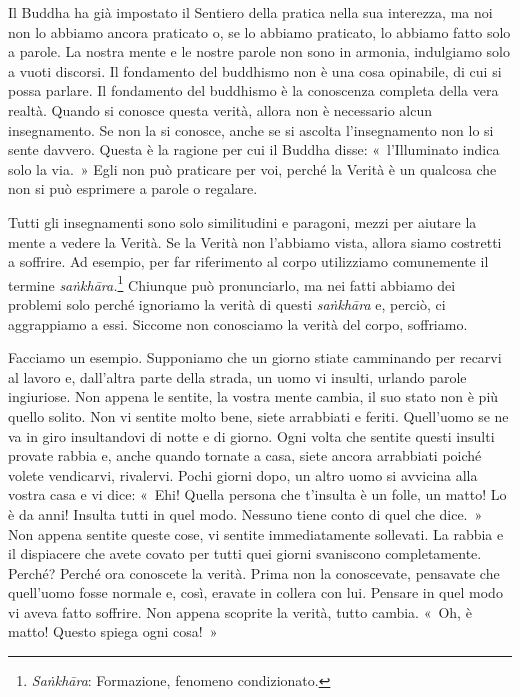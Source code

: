 Il Buddha ha già impostato il Sentiero della pratica nella sua
interezza, ma noi non lo abbiamo ancora praticato o, se lo abbiamo
praticato, lo abbiamo fatto solo a parole. La nostra mente e le nostre
parole non sono in armonia, indulgiamo solo a vuoti discorsi. Il
fondamento del buddhismo non è una cosa opinabile, di cui si possa
parlare. Il fondamento del buddhismo è la conoscenza completa della vera
realtà. Quando si conosce questa verità, allora non è necessario alcun
insegnamento. Se non la si conosce, anche se si ascolta l'insegnamento
non lo si sente davvero. Questa è la ragione per cui il Buddha disse:
«~l'Illuminato indica solo la via.~» Egli non può praticare per voi,
perché la Verità è un qualcosa che non si può esprimere a parole o
regalare.

Tutti gli insegnamenti sono solo similitudini e paragoni, mezzi per
aiutare la mente a vedere la Verità. Se la Verità non l'abbiamo vista,
allora siamo costretti a soffrire. Ad esempio, per far riferimento al
corpo utilizziamo comunemente il termine \emph{saṅkhāra.}\footnote{\emph{Saṅkhāra}:
  Formazione, fenomeno condizionato.} Chiunque può pronunciarlo, ma nei
fatti abbiamo dei problemi solo perché ignoriamo la verità di questi
\emph{saṅkhāra} e, perciò, ci aggrappiamo a essi. Siccome non conosciamo
la verità del corpo, soffriamo.

Facciamo un esempio. Supponiamo che un giorno stiate camminando per
recarvi al lavoro e, dall'altra parte della strada, un uomo vi insulti,
urlando parole ingiuriose. Non appena le sentite, la vostra mente
cambia, il suo stato non è più quello solito. Non vi sentite molto bene,
siete arrabbiati e feriti. Quell'uomo se ne va in giro insultandovi di
notte e di giorno. Ogni volta che sentite questi insulti provate rabbia
e, anche quando tornate a casa, siete ancora arrabbiati poiché volete
vendicarvi, rivalervi. Pochi giorni dopo, un altro uomo si avvicina alla
vostra casa e vi dice: «~Ehi! Quella persona che t'insulta è un folle,
un matto! Lo è da anni! Insulta tutti in quel modo. Nessuno tiene conto
di quel che dice.~» Non appena sentite queste cose, vi sentite
immediatamente sollevati. La rabbia e il dispiacere che avete covato per
tutti quei giorni svaniscono completamente. Perché? Perché ora conoscete
la verità. Prima non la conoscevate, pensavate che quell'uomo fosse
normale e, così, eravate in collera con lui. Pensare in quel modo vi
aveva fatto soffrire. Non appena scoprite la verità, tutto cambia. «~Oh,
è matto! Questo spiega ogni cosa!~»

